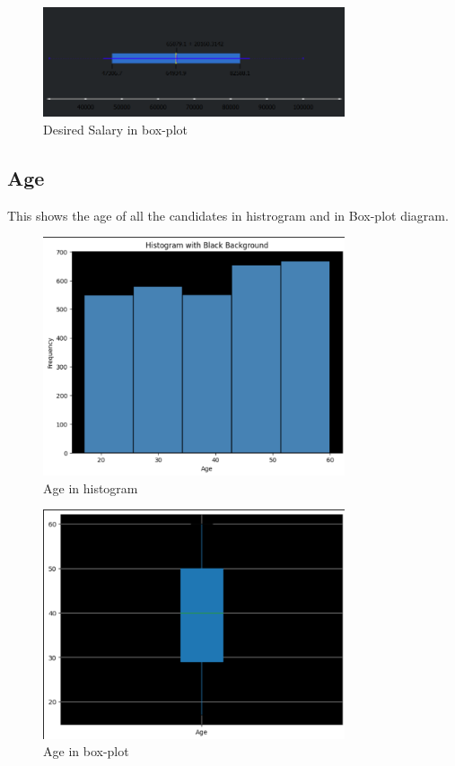 \documentclass[lettersize,journal]{IEEEtran}
\begin{document}
\begin{figure}[h]
\centering
\includegraphics[width=3.5in]{dsboxplot.png}
\caption{Desired Salary in box-plot}
\label{fig_5}
\end{figure}

\subsection{Age}
This shows the age of all the candidates in histrogram and in Box-plot diagram.
\vspace{15mm}

\begin{figure}[h]
\centering
\includegraphics[width=3.5in]{ageh.png}
\caption{Age in histogram}
\label{fig_5}
\end{figure}

\begin{figure}[h]
\centering
\includegraphics[width=3.5in]{agebox.png}
\caption{Age in box-plot}
\label{fig_5}
\end{figure}
\end{document}
